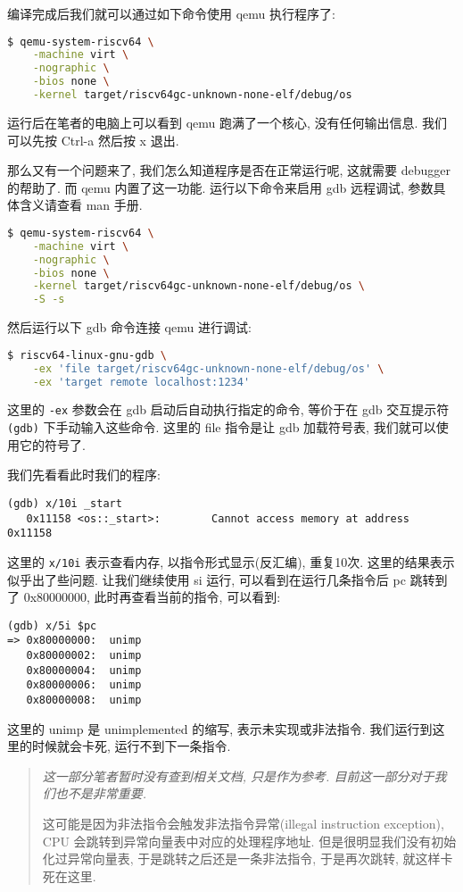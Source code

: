 \documentclass[a4paper]{ctexart}
\begin{document}
编译完成后我们就可以通过如下命令使用 qemu 执行程序了:
\begin{lstlisting}[language=bash]
$ qemu-system-riscv64 \
    -machine virt \
    -nographic \
    -bios none \
    -kernel target/riscv64gc-unknown-none-elf/debug/os
\end{lstlisting}
运行后在笔者的电脑上可以看到 qemu 跑满了一个核心,
没有任何输出信息.
我们可以先按 Ctrl-a 然后按 x 退出.

那么又有一个问题来了,
我们怎么知道程序是否在正常运行呢,
这就需要 debugger 的帮助了.
而 qemu 内置了这一功能.
运行以下命令来启用 gdb 远程调试,
参数具体含义请查看 man 手册.
\begin{lstlisting}[language=bash]
$ qemu-system-riscv64 \
    -machine virt \
    -nographic \
    -bios none \
    -kernel target/riscv64gc-unknown-none-elf/debug/os \
    -S -s
\end{lstlisting}

然后运行以下 gdb 命令连接 qemu 进行调试:
\begin{lstlisting}[language=bash]
$ riscv64-linux-gnu-gdb \
    -ex 'file target/riscv64gc-unknown-none-elf/debug/os' \
    -ex 'target remote localhost:1234'
\end{lstlisting}
这里的 \verb|-ex| 参数会在 gdb 启动后自动执行指定的命令,
等价于在 gdb 交互提示符 \verb|(gdb)| 下手动输入这些命令.
这里的 file 指令是让 gdb 加载符号表,
我们就可以使用它的符号了.

我们先看看此时我们的程序:
\begin{lstlisting}
(gdb) x/10i _start
   0x11158 <os::_start>:        Cannot access memory at address 0x11158
\end{lstlisting}
这里的 \verb|x/10i| 表示查看内存,
以指令形式显示(反汇编), 重复10次.
这里的结果表示似乎出了些问题.
让我们继续使用 si 运行,
可以看到在运行几条指令后 pc 跳转到了
0x80000000, 此时再查看当前的指令,
可以看到:
\begin{lstlisting}
(gdb) x/5i $pc
=> 0x80000000:  unimp
   0x80000002:  unimp
   0x80000004:  unimp
   0x80000006:  unimp
   0x80000008:  unimp
\end{lstlisting}
这里的 unimp 是 unimplemented 的缩写,
表示未实现或非法指令.
我们运行到这里的时候就会卡死, 运行不到下一条指令.

\begin{quote}
{\itshape
这一部分笔者暂时没有查到相关文档,
只是作为参考. 目前这一部分对于我们也不是非常重要.

这可能是因为非法指令会触发非法指令异常(illegal
instruction exception),
CPU 会跳转到异常向量表中对应的处理程序地址.
但是很明显我们没有初始化过异常向量表,
于是跳转之后还是一条非法指令, 于是再次跳转,
就这样卡死在这里.
}
\end{quote}
\end{document}
